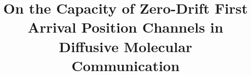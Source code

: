 \documentclass[conference]{IEEEtran}
\theoremstyle{definition}
\theoremstyle{plain}
\begin{document}
\title{On the Capacity of Zero-Drift First Arrival Position Channels in Diffusive Molecular Communication

}

\author{
\IEEEauthorblockA{\textit{Hon Hai (Foxconn) Research Institute} \\
Taipei, Taiwan \\
yen-chi.lee@foxconn.com}

\and
{}
}

\maketitle
\end{document}
